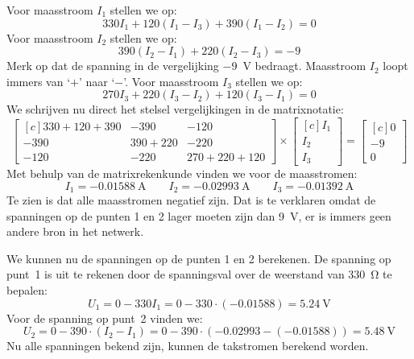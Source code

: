 \begin{example}[Maasstroommethode]
Voor maasstroom $I_1$ stellen we op:
%
\begin{equation}
330I_1 + 120(I_1-I_3) + 390(I_1-I_2) = 0
\end{equation}
%
Voor maasstroom $I_2$ stellen we op:
%
\begin{equation}
390(I_2-I_1) + 220(I_2-I_3) = -9
\end{equation}
%
Merk op dat de spanning in de vergelijking \SI{-9}{\volt} bedraagt. Maasstroom $I_2$ loopt immers van `$+$' naar `$-$'. Voor maasstroom $I_3$ stellen we op:
%
\begin{equation}
270I_3 + 220(I_3-I_2) + 120(I_3-I_1) = 0
\end{equation}
%
We schrijven nu direct het stelsel vergelijkingen in de matrixnotatie:
%
\begin{equation}
\begin{bmatrix*}[c]
330+120+390 & -390 & -120 \\
-390 & 390+220 & -220 \\
-120 & -220 & 270+220+120
\end{bmatrix*}\times
\begin{bmatrix*}[c]
I_1 \\ I_2 \\ I_3
\end{bmatrix*}=
\begin{bmatrix*}[c]
0 \\ -9 \\ 0
\end{bmatrix*}
\end{equation}
%
Met behulp van de matrixrekenkunde vinden we voor de maasstromen:
%
\begin{equation}
I_1 = \SI{-0.01588}{\ampere} \qquad I_2 = \SI{-0.02993}{\ampere} \qquad I_3=\SI{-0.01392}{\ampere}
\end{equation}
%
Te zien is dat alle maasstromen negatief zijn. Dat is te verklaren omdat de spanningen op de punten 1 en 2 lager moeten zijn dan \SI{9}{\volt}, er is immers geen andere bron in het netwerk.

We kunnen nu de spanningen op de punten 1 en 2 berekenen. De spanning op punt~1 is uit te rekenen door de spanningsval over de weerstand van \SI{330}{\ohm} te bepalen:
%
\begin{equation}
U_1 = \num{0} - 330I_1 = \num{0} - \num{330}\cdot(\num{-0.01588}) = \SI{5.24}{\volt} 
\end{equation}
%
Voor de spanning op punt~2 vinden we:
\begin{equation}
U_2 = \num{0} - 390\cdot(I_2-I_1) = \num{0} - 390\cdot(\num{-0.02993} - (\num{-0.01588})) = \SI{5.48}{\volt}
\end{equation}
%
Nu alle spanningen bekend zijn, kunnen de takstromen berekend worden.

\end{example}

